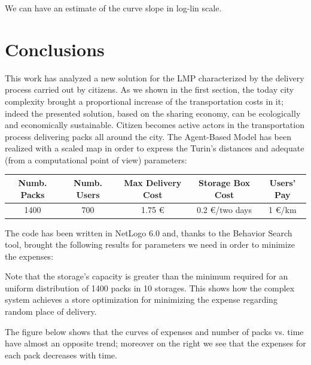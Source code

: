 \documentclass[11pt,a4paper]{article}
\begin{document}
We can have an estimate of the curve slope in log-lin scale.



\newpage
\section{Conclusions}
This work has analyzed a new solution for the LMP characterized by the delivery process carried out by citizens. As we shown in the first section, the today city complexity brought a proportional increase of the transportation costs in it; indeed the presented solution, based on the sharing economy, can be ecologically and economically sustainable. Citizen becomes active actors in the transportation process delivering packs all around the city. The Agent-Based Model has been realized with a scaled map in order to express the Turin's distances and adequate (from a computational point of view) parameters: 
\begin{center}
\begin{tabular}{c|c|c|c|c}
 \hline 
 Numb. Packs & Numb. Users & Max Delivery Cost & Storage Box Cost & Users' Pay \\ 
 \hline 
 \hline
 1400 & 700 & 1.75 \euro{} & 0.2 \euro{}/two days & 1 \euro{}/km \\ 
 \hline 
\end{tabular} 
\end{center} 
The code has been written in NetLogo 6.0 and, thanks to the Behavior Search tool, brought the following results for parameters we need in order to minimize the expenses: 
\begin{center}
 \end{center}
Note that the storage's capacity is greater than the minimum required for an uniform distribution of 1400 packs in 10 storages. This shows how the complex system achieves a store optimization for minimizing the expense regarding random place of delivery.
\bigskip

The figure below shows that the curves of expenses and number of packs vs. time have almost an opposite trend; moreover on the right we see that the expenses for each pack decreases with time.
\end{document}
